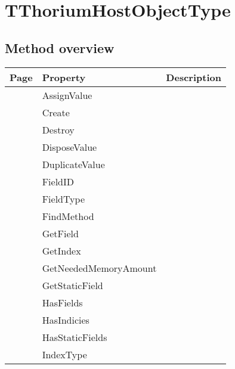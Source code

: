 \section{TThoriumHostObjectType}
\label{thoriumcore:thorium:tthoriumhostobjecttype}
\subsection{Method overview}
\label{thoriumcore:thorium:tthoriumhostobjecttype:methods}
\begin{tabularx}{\textwidth}{llX}
Page & Property & Description  \\ \hline
\pageref{thoriumcore:thorium:tthoriumhostobjecttype:assignvalue} & AssignValue  &  \\
\pageref{thoriumcore:thorium:tthoriumhostobjecttype:create} & Create  &  \\
\pageref{thoriumcore:thorium:tthoriumhostobjecttype:destroy} & Destroy  &  \\
\pageref{thoriumcore:thorium:tthoriumhostobjecttype:disposevalue} & DisposeValue  &  \\
\pageref{thoriumcore:thorium:tthoriumhostobjecttype:duplicatevalue} & DuplicateValue  &  \\
\pageref{thoriumcore:thorium:tthoriumhostobjecttype:fieldid} & FieldID  &  \\
\pageref{thoriumcore:thorium:tthoriumhostobjecttype:fieldtype} & FieldType  &  \\
\pageref{thoriumcore:thorium:tthoriumhostobjecttype:findmethod} & FindMethod  &  \\
\pageref{thoriumcore:thorium:tthoriumhostobjecttype:getfield} & GetField  &  \\
\pageref{thoriumcore:thorium:tthoriumhostobjecttype:getindex} & GetIndex  &  \\
\pageref{thoriumcore:thorium:tthoriumhostobjecttype:getneededmemoryamount} & GetNeededMemoryAmount  &  \\
\pageref{thoriumcore:thorium:tthoriumhostobjecttype:getstaticfield} & GetStaticField  &  \\
\pageref{thoriumcore:thorium:tthoriumhostobjecttype:hasfields} & HasFields  &  \\
\pageref{thoriumcore:thorium:tthoriumhostobjecttype:hasindicies} & HasIndicies  &  \\
\pageref{thoriumcore:thorium:tthoriumhostobjecttype:hasstaticfields} & HasStaticFields  &  \\
\pageref{thoriumcore:thorium:tthoriumhostobjecttype:indextype} & IndexType  &  \\

\end{tabularx}
